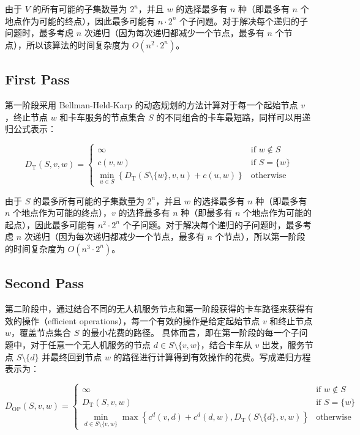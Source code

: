\documentclass[fontset=none]{ctexart}
\begin{document}
由于 $V$ 的所有可能的子集数量为 $2^n$，并且 $w$ 的选择最多有 $n$ 种（即最多有 $n$ 个地点作为可能的终点），因此最多可能有 $n \cdot 2^n$ 个子问题。对于解决每个递归的子问题时，最多考虑 $n$ 次递归（因为每次递归都减少一个节点，最多有 $n$ 个节点），所以该算法的时间复杂度为 $O(n^2\cdot 2^n)$。

\subsection{First Pass}

第一阶段采用 Bellman-Held-Karp 的动态规划的方法计算对于每一个起始节点 $v$，终止节点 $w$ 和卡车服务的节点集合 $S$ 的不同组合的卡车最短路，同样可以用递归公式表示：

\begin{equation}
    D_{\text{T}}(S, v, w) =
    \begin{cases}
        \infty & \text{if } w \notin S \\
        c(v, w) & \text{if } S = \{w\} \\
        \min_{u \in S} \left\{D_{\text{T}}(S \setminus \{w\}, v, u) + c(u, w)\right\} & \text{otherwise}
    \end{cases}
\end{equation}

由于 $S$ 的最多所有可能的子集数量为 $2^n$，并且 $w$ 的选择最多有 $n$ 种（即最多有 $n$ 个地点作为可能的终点），$v$ 的选择最多有 $n$ 种（即最多有 $n$ 个地点作为可能的起点），因此最多可能有 $n^2 \cdot 2^n$ 个子问题。对于解决每个递归的子问题时，最多考虑 $n$ 次递归（因为每次递归都减少一个节点，最多有 $n$ 个节点），所以第一阶段的时间复杂度为 $O(n^3 \cdot 2^n)$。

\subsection{Second Pass}

第二阶段中，通过结合不同的无人机服务节点和第一阶段获得的卡车路径来获得有效的操作（efficient operations），每一个有效的操作是给定起始节点 $v$ 和终止节点 $w$，覆盖节点集合 $S$ 的最小花费的路径。 具体而言，即在第一阶段的每一个子问题中，对于任意一个无人机服务的节点 $d \in S \setminus \{v, w\}$，结合卡车从 $v$ 出发，服务节点 $S \setminus \{d\}$ 并最终回到节点 $w$ 的路径进行计算得到有效操作的花费。写成递归方程表示为：

\begin{equation}
    D_{\text{OP}}(S, v, w) =
    \begin{cases}
        \infty & \text{if } w \notin S \\
        D_{\text{T}}(S, v, w) & \text{if } S = \{w\} \\
        \min_{d \in S \setminus \{v, w\}} \max\left\{c^d(v, d) + c^d(d, w), D_{\text{T}}(S \setminus \{d\}, v, w)\right\} & \text{otherwise}
    \end{cases}
\end{equation}
\end{document}
